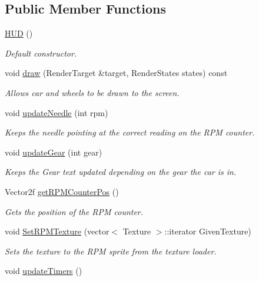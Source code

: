 \subsection*{Public Member Functions}
\begin{DoxyCompactItemize}
\item 
\hyperlink{class_h_u_d_a568b8ee1591f9ba3ed36ae05966f6b56}{H\+U\+D} ()
\begin{DoxyCompactList}\small\item\em Default constructor. \end{DoxyCompactList}\item 
void \hyperlink{class_h_u_d_a16086edcd0d5d6e62bd4d911dd0145e5}{draw} (Render\+Target \&target, Render\+States states) const 
\begin{DoxyCompactList}\small\item\em Allows car and wheels to be drawn to the screen. \end{DoxyCompactList}\item 
void \hyperlink{class_h_u_d_a96d4d120cedd21c3153d3c1fc45f5ef6}{update\+Needle} (int rpm)
\begin{DoxyCompactList}\small\item\em Keeps the needle pointing at the correct reading on the R\+P\+M counter. \end{DoxyCompactList}\item 
void \hyperlink{class_h_u_d_a0dc3e03d60ae3626345d9dc7e8287ff5}{update\+Gear} (int gear)
\begin{DoxyCompactList}\small\item\em Keeps the Gear text updated depending on the gear the car is in. \end{DoxyCompactList}\item 
Vector2f \hyperlink{class_h_u_d_adaa1781bccee569c107a667b095752de}{get\+R\+P\+M\+Counter\+Pos} ()
\begin{DoxyCompactList}\small\item\em Gets the position of the R\+P\+M counter. \end{DoxyCompactList}\item 
void \hyperlink{class_h_u_d_ab8ff106a8d659c4fc96ae8fae8771388}{Set\+R\+P\+M\+Texture} (vector$<$ Texture $>$\+::iterator Given\+Texture)
\begin{DoxyCompactList}\small\item\em Sets the texture to the R\+P\+M sprite from the texture loader. \end{DoxyCompactList}\item 
void \hyperlink{class_h_u_d_a18bacebe294e788fd5ed81df01231915}{update\+Timers} ()

\end{DoxyCompactItemize}
